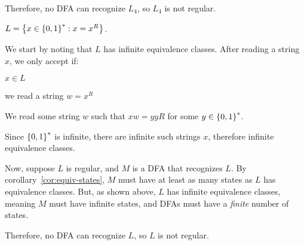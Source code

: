 \begin{problem}
\begin{enumalph}
\begin{enumroman}
\begin{Answer}
            \step
            Therefore, no DFA can recognize $L_4$,
            so $L_4$ is not regular.
          \end{Answer}
        \item $L = \left\{x \in \left\{0, 1\right\}^* : x = x^R\right\}$.
          \begin{Answer}
            \step
            We start by noting that $L$ has infinite equivalence classes.
            After reading a string $x$, we only accept if:
            \begin{enumroman}
              \item $x \in L$
              \item we read a string $w = x^R$
              \item We read some string $w$ such that $xw = yyR$ for some $y \in \left\{0, 1\right\}^*$.
            \end{enumroman}

            \step
            Since $\left\{0, 1\right\}^*$ is infinite, there are infinite such strings $x$,
            therefore infinite equivalence classes.

            \step
            Now, suppose $L$ is regular, and $M$ is a DFA that recognizes $L$.
            By corollary~\ref{cor:equiv-states}, $M$ must have
            at least as many states as $L$ has equivalence classes.
            But, as shown above, $L$ has infinite equivalence classes,
            meaning $M$ must have infinite states,
            and DFAs must have a \emph{finite} number of states.

            \step
            Therefore, no DFA can recognize $L$,
            so $L$ is not regular.
          \end{Answer}
      \end{enumroman}
  \end{enumalph}
\end{problem}
